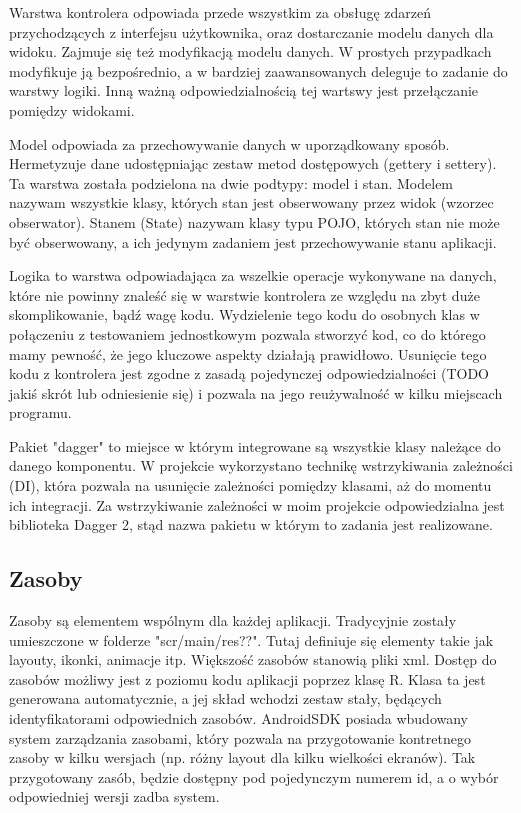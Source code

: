 \documentclass	{xmgr}
\begin{document}
Warstwa kontrolera odpowiada przede wszystkim za obsługę zdarzeń przychodzących z interfejsu użytkownika, oraz dostarczanie modelu danych dla widoku. Zajmuje się też modyfikacją modelu danych. W prostych przypadkach modyfikuje ją bezpośrednio, a w bardziej zaawansowanych deleguje to zadanie do warstwy logiki. Inną ważną odpowiedzialnością tej wartswy jest przełączanie pomiędzy widokami. 

Model odpowiada za przechowywanie danych w uporządkowany sposób. Hermetyzuje dane udostępniając zestaw metod dostępowych (gettery i settery). Ta warstwa została podzielona na dwie podtypy: model i stan. Modelem nazywam wszystkie klasy, których stan jest obserwowany przez widok (wzorzec obserwator). Stanem (State) nazywam klasy typu POJO, których stan nie może być obserwowany, a ich jedynym zadaniem jest przechowywanie stanu aplikacji. 

Logika to warstwa odpowiadająca za wszelkie operacje wykonywane na danych, które nie powinny znaleść się w warstwie kontrolera ze względu na zbyt duże skomplikowanie, bądź wagę kodu. Wydzielenie tego kodu do osobnych klas w połączeniu z testowaniem jednostkowym pozwala stworzyć kod, co do którego mamy pewność, że jego kluczowe aspekty działają prawidłowo. Usunięcie tego kodu z kontrolera jest zgodne z zasadą pojedynczej odpowiedzialności (TODO jakiś skrót lub odniesienie się) i pozwala na jego reużywalność w kilku miejscach programu. 

Pakiet "dagger" to miejsce w którym integrowane są wszystkie klasy należące do danego komponentu. W projekcie wykorzystano technikę wstrzykiwania zależności (DI), która pozwala na usunięcie zależności pomiędzy klasami, aż do momentu ich integracji. Za wstrzykiwanie zależności w moim projekcie odpowiedzialna jest biblioteka Dagger 2, stąd nazwa pakietu w którym to zadania jest realizowane.

\subsection{Zasoby}
Zasoby są elementem wspólnym dla każdej aplikacji. Tradycyjnie zostały umieszczone w folderze "scr/main/res??". Tutaj definiuje się elementy takie jak layouty, ikonki, animacje itp. Większość zasobów stanowią pliki xml. Dostęp do zasobów możliwy jest z poziomu kodu aplikacji poprzez klasę R. Klasa ta jest generowana automatycznie, a jej skład wchodzi zestaw stały, będących identyfikatorami odpowiednich zasobów. AndroidSDK posiada wbudowany system zarządzania zasobami, który pozwala na przygotowanie kontretnego zasoby w kilku wersjach (np. różny layout dla kilku wielkości ekranów). 
Tak przygotowany zasób, będzie dostępny pod pojedynczym numerem id, a o wybór odpowiedniej wersji zadba system.
\end{document}
